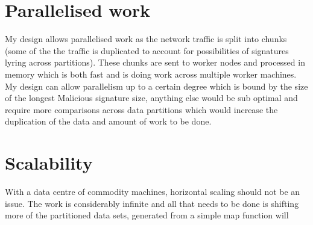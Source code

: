\documentclass[11pt]{article}
\begin{document}
\section{Parallelised work}
My design allows parallelised work as the network traffic is 
split into chunks (some of the the traffic is duplicated to 
account for possibilities of signatures lyring across
partitions). These chunks are sent to worker nodes and processed
in memory which is both fast and is doing work across multiple
worker machines. My design can allow parallelism up to a
certain degree which is bound by the size of the longest
Malicious signature size, anything else would be sub optimal and
require more comparisons across data partitions which would
increase the duplication of the data and amount of work to be 
done.

\section{Scalability}
With a data centre of commodity machines, horizontal scaling 
should not be an issue. The work is considerably infinite and
all that needs to be done is shifting more of the partitioned
data sets, generated from a simple map function will 
\end{document}
